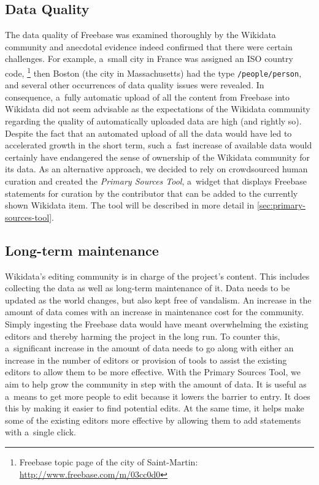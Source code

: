\documentclass{acm_proc_article-sp}
\begin{document}
\subsection{Data Quality}
\label{sec:dataquality}

The data quality of Freebase was examined thoroughly by the Wikidata community
and anecdotal evidence indeed confirmed that there were certain challenges.
For example, a~small city in France was assigned an ISO country code,%
\footnote{Freebase topic page of the city of Saint-Martin: \url{http://www.freebase.com/m/03cc0d0}}
then Boston (the city in Massachusetts) had the type \texttt{/people/person},
and several other occurrences of data quality issues were revealed.
In consequence, a~fully automatic upload of all the content from Freebase into Wikidata
did not seem advisable as the expectations of the Wikidata community regarding the
quality of automatically uploaded data are high (and rightly so).
Despite the fact that an automated upload of all the data
would have led to accelerated growth in the short term,
such a~fast increase of available data would certainly have endangered
the sense of ownership of the Wikidata community for its data.
As an alternative approach, we decided to rely on crowdsourced human curation
and created the \emph{Primary Sources Tool},
a~widget that displays Freebase statements
for curation by the contributor that can be added to the currently shown Wikidata item.
The tool will be described in more detail in \autoref{sec:primary-sources-tool}.

\subsection{Long-term maintenance}
\label{sec:longtermmaintenance}

Wikidata's editing community is in charge of the project's content. This includes collecting the
data as well as long-term maintenance of it. Data needs to be updated as the world changes, but also
kept free of vandalism. An increase in the amount of data comes with an increase in maintenance
cost for the community. Simply ingesting the Freebase data would have meant overwhelming the
existing editors and thereby harming the project in the long run. To counter this, a~significant
increase in the amount of data needs to go along with either an increase in the number of editors
or provision of tools to assist the existing editors to allow them to be more effective. With the
Primary Sources Tool, we aim to help grow the community in step with the amount of data. It is
useful as a~means to get more people to edit because it lowers the barrier to entry. It does this
by making it easier to find potential edits. At the same time, it helps make some of the existing
editors more effective by allowing them to add statements with a~single click.
\end{document}
